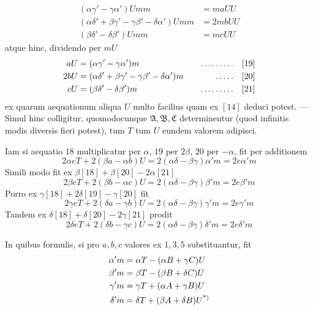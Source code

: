 \[
\begin{aligned}
(\alpha\gamma'-\gamma\alpha')Umm&=maUU\\
(\alpha\delta'+\beta\gamma'-\gamma\beta'-\delta\alpha')Umm&=2mbUU\\
(\beta\delta'-\delta\beta')Umm&=mcUU
\end{aligned}
\]
atque hinc, dividendo per \(mU\)
\[
\begin{aligned}
aU&=(\alpha\gamma'-\gamma\alpha')m&\quad\mathinner{.\,.\,.\,.\,.\,.\,.\,.\,.}\quad&[19]\\
2bU&=(\alpha\delta'+\beta\gamma'-\gamma\beta'-\delta\alpha')m&\quad\mathinner{.\,.\,.\,.\,.}\quad&[20]\\
cU&=(\beta\delta'-\delta\beta')m&\quad\mathinner{.\,.\,.\,.\,.\,.\,.\,.\,.}\quad&[21]
\end{aligned}
\]
ex quarum aequationum aliqua \(U\) multo facilius quam ex \([14]\) deduci potest. --- Simul hinc colligitur, quomodocunque \(\mathfrak{A},\mathfrak{B},\mathfrak{C}\) determinentur (quod infinitis modis diversis fieri potest), tum \(T\) tum \(U\) eundem valorem adipisci.

Iam si aequatio \(18\) multiplicatur per \(\alpha\), \(19\) per \(2\beta\), \(20\) per \(-\alpha\), fit per additionem
\[
2\alpha eT+2(\beta a-\alpha b)U=2(\alpha\delta-\beta\gamma)\alpha'm=2e\alpha'm
\]
Simili modo fit ex \(\beta[18]+\beta[20]-2\alpha[21]\)
\[
2\beta eT+2(\beta b-\alpha c)U=2(\alpha\delta-\beta\gamma)\beta'm=2e\beta'm
\]
Porro ex \(\gamma[18]+2\delta[19]-\gamma[20]\) fit
\[
2\gamma eT+2(\delta a-\gamma b)U=2(\alpha\delta-\beta\gamma)\gamma'm=2e\gamma'm
\]
Tandem ex \(\delta[18]+\delta[20]-2\gamma[21]\) prodit
\[
2\delta eT+2(\delta b-\gamma c)U=2(\alpha\delta-\beta\gamma)\delta'm=2e\delta'm
\]

In quibus formulis, si pro \(a,b,c\) valores ex \(1,3,5\) substituantur, fit
\[
\begin{aligned}
\alpha'm&=\alpha T-(\alpha B+\gamma C)U\\
\beta'm&=\beta T-(\beta B+\delta C)U\\
\gamma'm&=\gamma T+(\alpha A+\gamma B)U\\
\delta'm&=\delta T+(\beta A+\delta B)U\text{\textsuperscript{*)}}
\end{aligned}
\]


